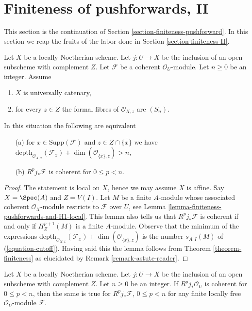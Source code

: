 \section{Finiteness of pushforwards, II}
\label{section-finiteness-pushforward-II}

\noindent
This section is the continuation of
Section \ref{section-finiteness-pushforward}.
In this section we reap the fruits of the labor done in
Section \ref{section-finiteness-II}.

\begin{lemma}
\label{lemma-finiteness-Rjstar}
Let $X$ be a locally Noetherian scheme. Let $j : U \to X$ be the inclusion
of an open subscheme with complement $Z$. Let $\mathcal{F}$ be a coherent
$\mathcal{O}_U$-module. Let $n \geq 0$ be an integer. Assume
\begin{enumerate}
\item $X$ is universally catenary,
\item for every $z \in Z$ the formal fibres of
$\mathcal{O}_{X, z}$ are $(S_n)$.
\end{enumerate}
In this situation the following are equivalent
\begin{enumerate}
\item[(a)] for $x \in \text{Supp}(\mathcal{F})$ and
$z \in Z \cap \overline{\{x\}}$ we have
$\text{depth}_{\mathcal{O}_{X, x}}(\mathcal{F}_x) +
\dim(\mathcal{O}_{\overline{\{x\}}, z}) > n$,
\item[(b)] $R^pj_*\mathcal{F}$ is coherent for $0 \leq p < n$.
\end{enumerate}
\end{lemma}

\begin{proof}
The statement is local on $X$, hence we may assume $X$ is affine.
Say $X = \Spec(A)$ and $Z = V(I)$. Let $M$ be a finite $A$-module
whose associated coherent $\mathcal{O}_X$-module restricts
to $\mathcal{F}$ over $U$, see
Lemma \ref{lemma-finiteness-pushforwards-and-H1-local}.
This lemma also tells us that $R^pj_*\mathcal{F}$ is coherent
if and only if $H^{p + 1}_Z(M)$ is a finite $A$-module.
Observe that the minimum of the expressions
$\text{depth}_{\mathcal{O}_{X, x}}(\mathcal{F}_x) +
\dim(\mathcal{O}_{\overline{\{x\}}, z})$
is the number $s_{A, I}(M)$ of (\ref{equation-cutoff}).
Having said this the lemma follows from
Theorem \ref{theorem-finiteness}
as elucidated by Remark \ref{remark-astute-reader}.
\end{proof}

\begin{lemma}
\label{lemma-finiteness-for-finite-locally-free}
Let $X$ be a locally Noetherian scheme. Let $j : U \to X$ be the inclusion
of an open subscheme with complement $Z$. Let $n \geq 0$ be an integer.
If $R^pj_*\mathcal{O}_U$ is coherent for $0 \leq p < n$, then
the same is true for $R^pj_*\mathcal{F}$, $0 \leq p < n$
for any finite locally free $\mathcal{O}_U$-module $\mathcal{F}$.
\end{lemma}

